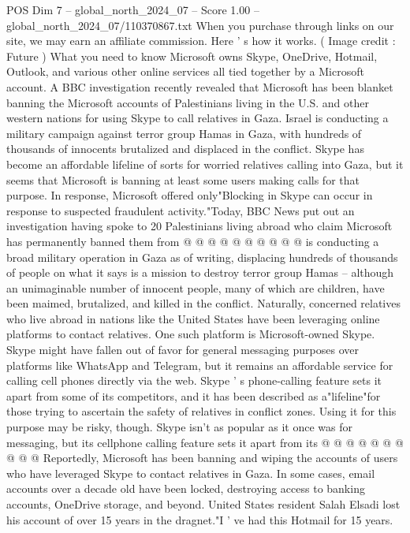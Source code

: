 \begin{textsample}{POS Dim 7 – global\_north\_2024\_07 – Score 1.00 – global\_north\_2024\_07/110370867.txt}  \label{ex:f7_pos_339}
When you purchase through links on our site, we may earn an affiliate commission.
Here ' s how it works. ( Image credit : Future ) What you need to know Microsoft owns Skype, OneDrive, Hotmail, Outlook, and various other online services all tied together by a Microsoft account.
A BBC investigation recently revealed that Microsoft has been blanket banning the Microsoft accounts of Palestinians living in the U.S. and other western nations for using Skype to call relatives in Gaza.
Israel is conducting a military campaign against terror group Hamas in Gaza, with hundreds of thousands of innocents brutalized and displaced in the conflict.
Skype has become an affordable lifeline of sorts for worried relatives calling into Gaza, but it seems that Microsoft is banning at least some users making calls for that purpose.
In response, Microsoft offered only"Blocking in Skype can occur in response to suspected fraudulent activity."Today, BBC News put out an investigation having spoke to 20 Palestinians living abroad who claim Microsoft has permanently banned them from @ @ @ @ @ @ @ @ @ @ is conducting a broad military operation in Gaza as of writing, displacing hundreds of thousands of people on what it says is a mission to destroy terror group Hamas -- although an unimaginable number of innocent people, many of which are children, have been maimed, brutalized, and killed in the conflict.
Naturally, concerned relatives who live abroad in nations like the United States have been leveraging online platforms to contact relatives.
One such platform is Microsoft-owned Skype.
Skype might have fallen out of favor for general messaging purposes over platforms like WhatsApp and Telegram, but it remains an affordable service for calling cell phones directly via the web.
Skype ' s phone-calling feature sets it apart from some of its competitors, and it has been described as a"lifeline"for those trying to ascertain the safety of relatives in conflict zones.
Using it for this purpose may be risky, though.
Skype isn't as popular as it once was for messaging, but its cellphone calling feature sets it apart from its @ @ @ @ @ @ @ @ @ @ Reportedly, Microsoft has been banning and wiping the accounts of users who have leveraged Skype to contact relatives in Gaza.
In some cases, email accounts over a decade old have been locked, destroying access to banking accounts, OneDrive storage, and beyond.
United States resident Salah Elsadi lost his account of over 15 years in the dragnet."I ' ve had this Hotmail for 15 years.

\end{textsample}
